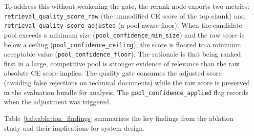 To address this without weakening the gate, the rerank node exports two metrics: \texttt{retrieval\_quality\_score\_raw} (the unmodified CE score of the top chunk) and \texttt{retrieval\_quality\_score\_adjusted} (a pool-aware floor). When the candidate pool exceeds a minimum size (\texttt{pool\_confidence\_min\_size}) and the raw score is below a ceiling (\texttt{pool\_confidence\_ceiling}), the score is floored to a minimum acceptable value (\texttt{pool\_confidence\_floor}). The rationale is that being ranked first in a large, competitive pool is stronger evidence of relevance than the raw absolute CE score implies. The quality gate consumes the adjusted score (avoiding false rejections on technical documents) while the raw score is preserved in the evaluation bundle for analysis. The \texttt{pool\_confidence\_applied} flag records when the adjustment was triggered.

Table~\ref{tab:ablation_findings} summarizes the key findings from the ablation study and their implications for system design.

\begin{table}[H]
\centering
\caption{Key Findings from Ablation Study}
\label{tab:ablation_findings}
\end{table}
